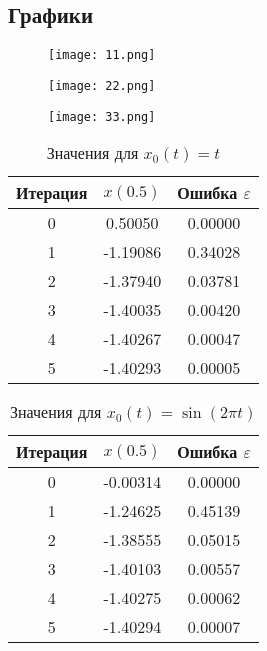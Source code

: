 \documentclass{article}
\begin{document}
\subsection{Графики}

\begin{figure}[!ht] 
    \centering
    \texttt{[image: 11.png]}
\end{figure}

\begin{figure}[!ht] 
    \centering
    \texttt{[image: 22.png]}
\end{figure}

\begin{figure}[!ht] 
    \centering
    \texttt{[image: 33.png]}
\end{figure}


\begin{table}[H]
    \centering
    \small
    \setlength{\tabcolsep}{10pt}
    \renewcommand{\arraystretch}{1.2}
    \caption{Значения для $x_0(t) = t$}
    \begin{tabular}{c c c}
        \toprule
        Итерация & $x(0.5)$ & Ошибка $\varepsilon$ \\
        \midrule
        0 & 0.50050 & 0.00000 \\
        1 & -1.19086 & 0.34028 \\
        2 & -1.37940 & 0.03781 \\
        3 & -1.40035 & 0.00420 \\
        4 & -1.40267 & 0.00047 \\
        5 & -1.40293 & 0.00005 \\
        \bottomrule
    \end{tabular}
\end{table}

\begin{table}[H]
    \centering
    \small
    \setlength{\tabcolsep}{10pt}
    \renewcommand{\arraystretch}{1.2}
    \caption{Значения для $x_0(t) = \sin(2\pi t)$}
    \begin{tabular}{c c c}
        \toprule
        Итерация & $x(0.5)$ & Ошибка $\varepsilon$ \\
        \midrule
        0 & -0.00314 & 0.00000 \\
        1 & -1.24625 & 0.45139 \\
        2 & -1.38555 & 0.05015 \\
        3 & -1.40103 & 0.00557 \\
        4 & -1.40275 & 0.00062 \\
        5 & -1.40294 & 0.00007 \\
        \bottomrule
    \end{tabular}
\end{table}
\end{document}

